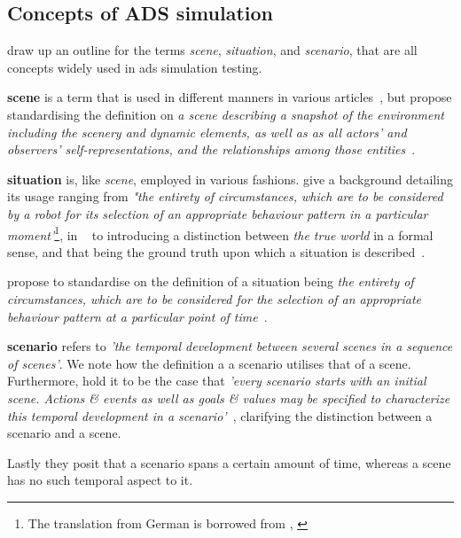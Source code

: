 \subsection{Concepts of ADS simulation}\label{sec:adsSimConcepts}

\citeauthor{scenes} draw up an outline for the terms \textit{scene}, \textit{situation}, and
\textit{scenario}, that are all concepts widely used in \acrshort{ads} simulation testing.

\textbf{scene} is a term that is used in different manners in various
articles~\cite[982]{scenes}, but \citeauthor{scenes} propose standardising the definition on
\textit{a scene describing a snapshot of the environment including the scenery and dynamic elements,
    as well as  as all actors’ and observers’ self-representations, and the relationships among those entities}~\cite[983]{scenes}.

\textbf{situation} is, like \textit{scene}, employed in various fashions. \citeauthor{scenes}
give a background detailing its usage ranging from \textit{"the entirety of circumstances,
    which are to be considered by a robot for its selection of an appropriate behaviour pattern in a
    particular moment'}\footnote{The translation from German is borrowed from \citeauthor{scenes},
    \cite[984]{scenes}}, in  \citeauthor{scenarioTysk}~\cite[3]{scenarioTysk} to
\citeauthor{schmidtScenario} introducing a distinction between \textit{the true world} in a formal
sense, and that being the ground truth upon which a situation is
described~\cite[892]{schmidtScenario}.

\citeauthor{scenes} propose to standardise on the definition of a situation being \textit{
    the entirety of circumstances, which  are to be considered for the selection of an
    appropriate behaviour pattern at a particular point of time}~\cite[985]{scenes}.

\textbf{scenario} refers to \textit{'the temporal development between several scenes in a sequence
    of scenes'}\cite[986]{scenes}. We note how the definition a a scenario utilises that of a scene.
Furthermore, \citeauthor{scenes} hold it to be the case that \textit{'every scenario starts with an
    initial scene. Actions \& events as well as goals \& values may be  specified to characterize
    this temporal development in a scenario'}~\cite[986]{scenes}, clarifying the distinction
between a scenario and a scene.

Lastly they posit that a scenario spans a certain amount of time, whereas a scene has no such
temporal aspect to it.


